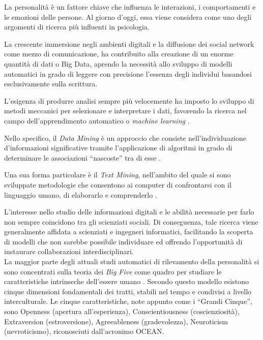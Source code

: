 La personalità è un fattore chiave che influenza le interazioni, i comportamenti e le emozioni delle persone. Al giorno d'oggi, essa viene considera come uno degli argomenti di ricerca più influenti in psicologia.

La crescente immersione negli ambienti digitali e la diffusione dei social network come mezzo di comunicazione, ha contribuito alla creazione di un enorme quantità di dati o Big Data, aprendo la necessità allo sviluppo di modelli automatici in grado di leggere con precisione l'essenza degli individui basandosi esclusivamente sulla scrittura.

L'esigenza di produrre analisi sempre più velocemente ha imposto lo sviluppo di metodi meccanici per selezionare e interpretare i dati, favorendo la ricerca nel campo dell'apprendimento automatico o \emph{machine learning} \cite{samuel1959some}.

Nello specifico, il \emph{Data Mining} è un approccio che consiste nell'individuazione d’informazioni significative tramite l'applicazione di algoritmi in grado di determinare le associazioni ``nascoste'' tra di esse  \cite{chakrabarti2006data,franklin2005elements}. 

Una sua forma particolare è il \emph{Text Mining}, nell'ambito del quale si sono sviluppate metodologie che consentono ai computer di confrontarsi con il linguaggio umano, di elaborarlo e comprenderlo \cite{tan1999text}.

L'interesse nello studio delle informazioni digitali e le abilità necessarie per farlo non sempre coincidono tra gli scienziati sociali. Di conseguenza, tale ricerca viene generalmente affidata a scienziati e ingegneri informatici, facilitando la scoperta di modelli che non sarebbe possibile individuare ed offrendo l'opportunità di instaurare collaborazioni interdisciplinari.
\\

La maggior parte degli attuali studi automatici di rilevamento della personalità si sono concentrati sulla teoria dei \emph{Big Five} come quadro per studiare le caratteristiche intrinseche dell'essere umano \cite{barrick1991big}.
Secondo questo modello esistono cinque dimensioni fondamentali dei tratti, stabili nel tempo e condivisi a livello interculturale. Le cinque caratteristiche, note appunto come i ``Grandi Cinque'', sono Openness (apertura all'esperienza), Conscientiousness (coscienziosità), Extraversion (estroversione), Agreeableness (gradevolezza), Neuroticism (nevroticismo), riconosciuti dall'acronimo OCEAN.


